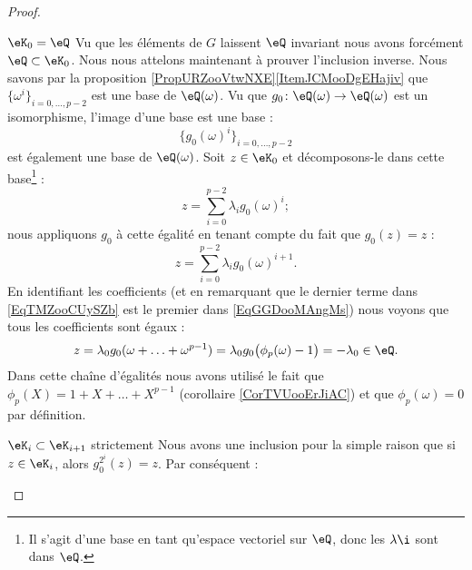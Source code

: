\begin{proof}
\begin{subproof}
\begin{subproof}
                \item[\( \eK_0=\eQ\)]
                    Vu que les éléments de \( G\) laissent \( \eQ\) invariant nous avons forcément \( \eQ\subset \eK_0\). Nous nous attelons maintenant à prouver l'inclusion inverse. Nous savons par la proposition \ref{PropURZooVtwNXE}\ref{ItemJCMooDgEHajiv} que \( \{ \omega^i \}_{i=0,\ldots, p-2}\) est une base de \( \eQ(\omega)\). Vu que \( g_0\colon \eQ(\omega)\to \eQ(\omega)\) est un isomorphisme, l'image d'une base est une base :
                    \begin{equation}
                        \{ g_0(\omega)^i \}_{i=0,\ldots, p-2}
                    \end{equation}
                    est également une base de \( \eQ(\omega)\). Soit \( z\in \eK_0\) et décomposons-le dans cette base\footnote{Il s'agit d'une base en tant qu'espace vectoriel sur \( \eQ\), donc les \( \lambda\i\) sont dans \( \eQ\).} :
                    \begin{equation}    \label{EqTMZooCUySZb}
                        z=\sum_{i=0}^{p-2}\lambda_i g_0(\omega)^i;
                    \end{equation}
                    nous appliquons \( g_0\) à cette égalité en tenant compte du fait que \( g_0(z)=z\) :
                    \begin{equation}    \label{EqGGDooMAngMs}
                        z=\sum_{i=0}^{p-2}\lambda_ig_0(\omega)^{i+1}.
                    \end{equation}
                    En identifiant les coefficients (et en remarquant que le dernier terme dans \eqref{EqTMZooCUySZb} est le premier dans \eqref{EqGGDooMAngMs}) nous voyons que tous les coefficients sont égaux :
                    \begin{equation}
                        z=\lambda_0g_0(\omega+\ldots +\omega^{p-1})=\lambda_0g_0\big( \phi_p(\omega)-1 \big)=-\lambda_0\in \eQ.
                    \end{equation}
                    Dans cette chaîne d'égalités nous avons utilisé le fait que \( \phi_p(X)=1+X+\ldots +X^{p-1}\) (corollaire \ref{CorTVUooErJiAC}) et que \( \phi_p(\omega)=0\) par définition.
                    \item[\( \eK_i\subset \eK_{i+1}\) strictement]
                        Nous avons une inclusion pour la simple raison que si \( z\in \eK_i\), alors \( g_0^{2^i}(z)=z\). Par conséquent :

\end{subproof}
\end{subproof}
\end{proof}
